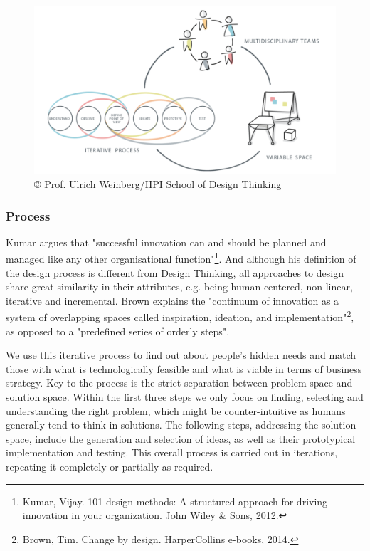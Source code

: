 \begin{figure}
  \centering
    \includegraphics[width=1.0\textwidth]{Figures/ChapterContext/d_process}
  \caption[The Design-Thinking process]{© Prof. Ulrich Weinberg/HPI School of Design Thinking}
  \label{fig:d_process}
\end{figure}

\subsubsection{Process}

Kumar argues that "successful innovation can and should be planned and managed like any other organisational function"\footnote{Kumar, Vijay. 101 design methods: A structured approach for driving innovation in your organization. John Wiley \& Sons, 2012.}. And although his definition of the design process is different from Design Thinking, all approaches to design share great similarity in their attributes, e.g. being human-centered, non-linear, iterative and incremental. Brown explains the "continuum of innovation as a system of overlapping spaces called inspiration, ideation, and implementation"\footnote{Brown, Tim. Change by design. HarperCollins e-books, 2014.}, as opposed to a "predefined series of orderly steps". 

We use this iterative process to find out about people's hidden needs and match those with what is technologically feasible and what is viable in terms of business strategy. Key to the process is the strict separation between problem space and solution space. Within the first three steps we only focus on finding, selecting and understanding the right problem, which might be counter-intuitive as humans generally tend to think in solutions. The following steps, addressing the solution space, include the generation and selection of ideas, as well as their prototypical implementation and testing. This overall process is carried out in iterations, repeating it completely or partially as required.

